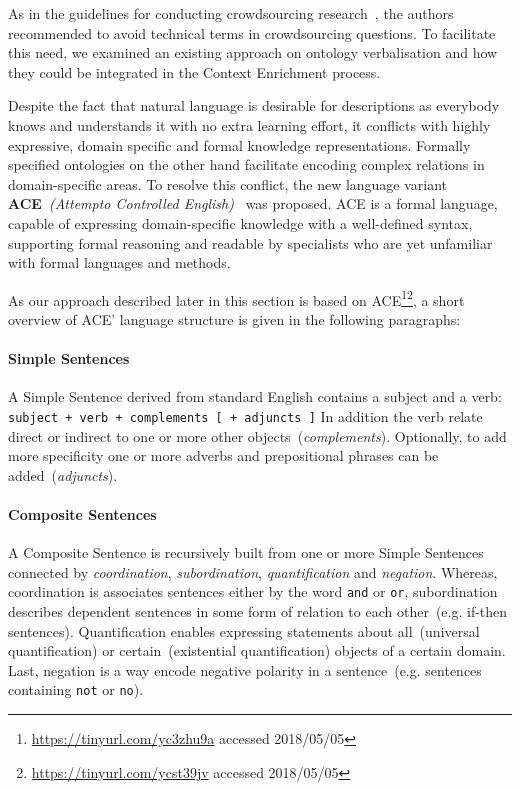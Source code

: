 \documentclass[draft,final]{vutinfth} %
\begin{document}
As in the guidelines for conducting crowdsourcing research~\cite{sarasua2015crowdsourcing}, the authors recommended to avoid technical terms in crowdsourcing questions. To facilitate this need, we examined an existing approach on ontology verbalisation and how they could be integrated in the Context Enrichment process. 

Despite the fact that natural language is desirable for descriptions as everybody knows and understands it with no extra learning effort, it conflicts with highly expressive, domain specific and formal knowledge representations. Formally specified ontologies on the other hand facilitate encoding complex relations in domain-specific areas. To resolve this conflict, the new language variant \textbf{ACE}~\textit{(Attempto Controlled English)}~\cite{fuchs2008} was proposed. ACE is a formal language, capable of expressing domain-specific knowledge with a well-defined syntax, supporting formal reasoning and readable by specialists who are yet unfamiliar with formal languages and methods.

As our approach described later in this section is based on ACE\footnote{\url{https://tinyurl.com/yc3zhu9a} accessed 2018/05/05}\footnote{\url{https://tinyurl.com/ycst39jv} accessed 2018/05/05}, a short overview of ACE' language structure is given in the following paragraphs:
 
 \paragraph{Simple Sentences} A Simple Sentence derived from standard English contains a subject and a verb: \texttt{subject + verb + complements [ + adjuncts ]} In addition the verb relate direct or indirect to one or more other objects~(\textit{complements}). Optionally, to add more specificity one or more adverbs and prepositional phrases can be added~(\textit{adjuncts}). 

\paragraph{Composite Sentences} A Composite Sentence is recursively built from one or more Simple Sentences connected by \textit{coordination},
\textit{subordination}, \textit{quantification} and \textit{negation}. Whereas, coordination is associates sentences either by the word \texttt{and} or \texttt{or}, subordination describes dependent sentences in some form of relation to each other~(e.g. if-then sentences). Quantification enables expressing statements about all~(universal quantification) or certain~(existential quantification) objects of a certain domain. Last, negation is a way encode negative polarity in a sentence~(e.g. sentences containing \texttt{not} or \texttt{no}). 
\end{document}

